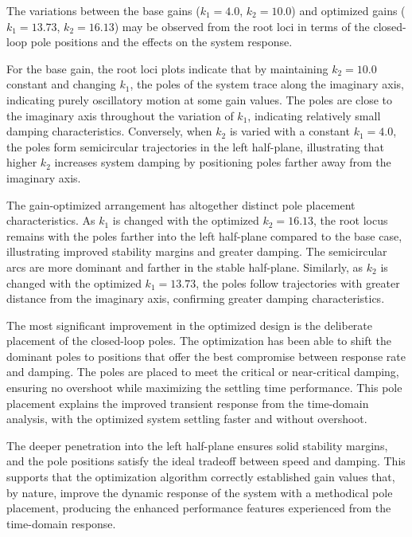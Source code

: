 \documentclass{ifacconf}
\begin{document}
The variations between the base gains ($k_1=4.0$, $k_2=10.0$) and optimized gains ($k_1=13.73$, $k_2=16.13$) may be observed from the root loci in terms of the closed-loop pole positions and the effects on the system response.

For the base gain, the root loci plots indicate that by maintaining $k_2=10.0$ constant and changing $k_1$, the poles of the system trace along the imaginary axis, indicating purely oscillatory motion at some gain values. The poles are close to the imaginary axis throughout the variation of $k_1$, indicating relatively small damping characteristics. Conversely, when $k_2$ is varied with a constant $k_1=4.0$, the poles form semicircular trajectories in the left half-plane, illustrating that higher $k_2$ increases system damping by positioning poles farther away from the imaginary axis.

The gain-optimized arrangement has altogether distinct pole placement characteristics. As $k_1$ is changed with the optimized $k_2=16.13$, the root locus remains with the poles farther into the left half-plane compared to the base case, illustrating improved stability margins and greater damping. The semicircular arcs are more dominant and farther in the stable half-plane. Similarly, as $k_2$ is changed with the optimized $k_1=13.73$, the poles follow trajectories with greater distance from the imaginary axis, confirming greater damping characteristics.

The most significant improvement in the optimized design is the deliberate placement of the closed-loop poles. The optimization has been able to shift the dominant poles to positions that offer the best compromise between response rate and damping. The poles are placed to meet the critical or near-critical damping, ensuring no overshoot while maximizing the settling time performance. This pole placement explains the improved transient response from the time-domain analysis, with the optimized system settling faster and without overshoot.

The deeper penetration into the left half-plane ensures solid stability margins, and the pole positions satisfy the ideal tradeoff between speed and damping. This supports that the optimization algorithm correctly established gain values that, by nature, improve the dynamic response of the system with a methodical pole placement, producing the enhanced performance features experienced from the time-domain response.
\end{document}
